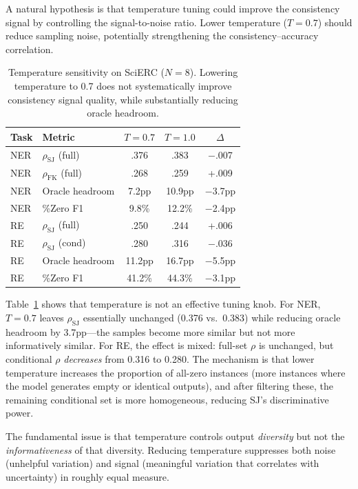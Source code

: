 \documentclass[11pt,a4paper]{article}
\begin{document}
A natural hypothesis is that temperature tuning could improve the consistency signal by controlling the signal-to-noise ratio.
Lower temperature ($T{=}0.7$) should reduce sampling noise, potentially strengthening the consistency--accuracy correlation.

\begin{table}[t]
\centering
\small
\begin{tabular}{llccc}
\toprule
\textbf{Task} & \textbf{Metric} & $T{=}0.7$ & $T{=}1.0$ & $\Delta$ \\
\midrule
NER & $\rho_{\text{SJ}}$ (full) & .376 & .383 & $-$.007 \\
NER & $\rho_{\text{FK}}$ (full) & .268 & .259 & +.009 \\
NER & Oracle headroom & 7.2pp & 10.9pp & $-$3.7pp \\
NER & \%Zero F1 & 9.8\% & 12.2\% & $-$2.4pp \\
\midrule
RE & $\rho_{\text{SJ}}$ (full) & .250 & .244 & +.006 \\
RE & $\rho_{\text{SJ}}$ (cond) & .280 & .316 & $-$.036 \\
RE & Oracle headroom & 11.2pp & 16.7pp & $-$5.5pp \\
RE & \%Zero F1 & 41.2\% & 44.3\% & $-$3.1pp \\
\bottomrule
\end{tabular}
\caption{Temperature sensitivity on SciERC ($N{=}8$). Lowering temperature to 0.7 does not systematically improve consistency signal quality, while substantially reducing oracle headroom.}
\label{tab:temperature}
\end{table}

Table~\ref{tab:temperature} shows that temperature is not an effective tuning knob.
For NER, $T{=}0.7$ leaves $\rho_{\text{SJ}}$ essentially unchanged (0.376 vs.\ 0.383) while reducing oracle headroom by 3.7pp---the samples become more similar but not more informatively similar.
For RE, the effect is mixed: full-set $\rho$ is unchanged, but conditional $\rho$ \emph{decreases} from 0.316 to 0.280.
The mechanism is that lower temperature increases the proportion of all-zero instances (more instances where the model generates empty or identical outputs), and after filtering these, the remaining conditional set is more homogeneous, reducing SJ's discriminative power.

The fundamental issue is that temperature controls output \emph{diversity} but not the \emph{informativeness} of that diversity.
Reducing temperature suppresses both noise (unhelpful variation) and signal (meaningful variation that correlates with uncertainty) in roughly equal measure.
\end{document}

